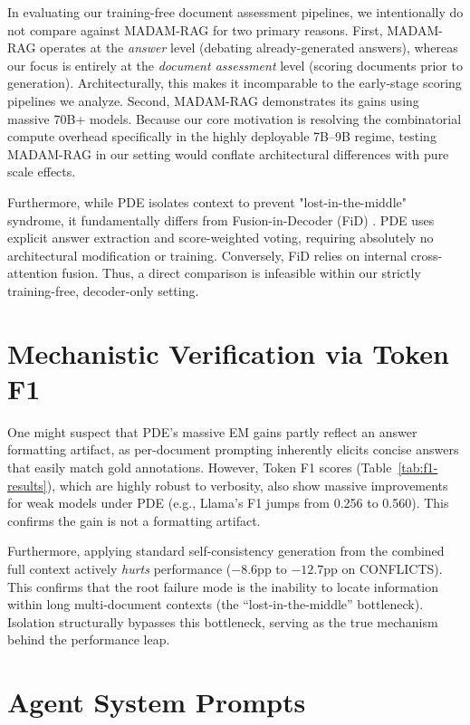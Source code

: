 \documentclass[11pt]{article}
\theoremstyle{definition}
\begin{document}
In evaluating our training-free document assessment pipelines, we intentionally do not compare against MADAM-RAG \citep{wang2025retrieval} for two primary reasons. First, MADAM-RAG operates at the \emph{answer} level (debating already-generated answers), whereas our focus is entirely at the \emph{document assessment} level (scoring documents prior to generation). Architecturally, this makes it incomparable to the early-stage scoring pipelines we analyze. Second, MADAM-RAG demonstrates its gains using massive 70B+ models. Because our core motivation is resolving the combinatorial compute overhead specifically in the highly deployable 7B--9B regime, testing MADAM-RAG in our setting would conflate architectural differences with pure scale effects.

Furthermore, while PDE isolates context to prevent "lost-in-the-middle" syndrome, it fundamentally differs from Fusion-in-Decoder (FiD) \citep{izacard2021leveraging}. PDE uses explicit answer extraction and score-weighted voting, requiring absolutely no architectural modification or training. Conversely, FiD relies on internal cross-attention fusion. Thus, a direct comparison is infeasible within our strictly training-free, decoder-only setting.



\section{Mechanistic Verification via Token F1}
\label{sec:appendix-f1-mechanistic}
One might suspect that PDE's massive EM gains partly reflect an answer formatting artifact, as per-document prompting inherently elicits concise answers that easily match gold annotations. However, Token F1 scores (Table~\ref{tab:f1-results}), which are highly robust to verbosity, also show massive improvements for weak models under PDE (e.g., Llama's F1 jumps from 0.256 to 0.560). This confirms the gain is not a formatting artifact. 

Furthermore, applying standard self-consistency generation from the combined full context actively \emph{hurts} performance (\(-8.6\)pp to \(-12.7\)pp on CONFLICTS). This confirms that the root failure mode is the inability to locate information within long multi-document contexts (the ``lost-in-the-middle'' bottleneck). Isolation structurally bypasses this bottleneck, serving as the true mechanism behind the performance leap.


\onecolumn
\section{Agent System Prompts}
\label{sec:appendix-agent-prompts}
\end{document}
